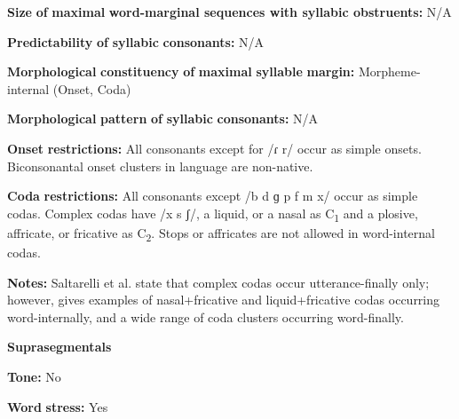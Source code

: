 \documentclass[output=paper]{langsci/langscibook}
\begin{document}
\begin{styleBody}
\textbf{Size} \textbf{of} \textbf{maximal} \textbf{word{}-marginal sequences with syllabic obstruents:} N/A
\end{styleBody}

\begin{styleBody}
\textbf{Predictability} \textbf{of} \textbf{syllabic} \textbf{consonants:} N/A
\end{styleBody}

\begin{styleBody}
\textbf{Morphological} \textbf{constituency} \textbf{of} \textbf{maximal} \textbf{syllable} \textbf{margin:} Morpheme-internal (Onset, Coda)
\end{styleBody}

\begin{styleBody}
\textbf{Morphological} \textbf{pattern} \textbf{of} \textbf{syllabic} \textbf{consonants:} N/A
\end{styleBody}

\begin{styleBody}
\textbf{Onset} \textbf{restrictions:} All consonants except for /ɾ r/ occur as simple onsets. Biconsonantal onset clusters in language are non-native.
\end{styleBody}

\begin{styleBody}
\textbf{Coda} \textbf{restrictions:} All consonants except /b d ɡ p f m x/ occur as simple codas. Complex codas have /x s ʃ/, a liquid, or a nasal as C\textsubscript{1} and a plosive, affricate, or fricative as C\textsubscript{2}. Stops or affricates are not allowed in word-internal codas.
\end{styleBody}

\begin{styleBody}
\textbf{Notes:} Saltarelli et al. state that complex codas occur utterance-finally only; however, \citet{Hualde2003} gives examples of nasal+fricative and liquid+fricative codas occurring word-internally, and a wide range of coda clusters occurring word-finally.
\end{styleBody}

\begin{styleBody}
\textbf{Suprasegmentals}
\end{styleBody}

\begin{styleBody}
\textbf{Tone:} No
\end{styleBody}

\begin{styleBody}
\textbf{Word} \textbf{stress:} Yes
\end{styleBody}
\end{document}
